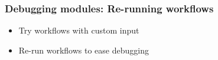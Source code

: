 \begin{frame}
    \frametitle{Debugging modules: Re-running workflows}
    \begin{itemize}
        \item Try workflows with custom input
        \item Re-run workflows to ease debugging
    \end{itemize}
    \begin{center}
    \end{center}
\end{frame}

